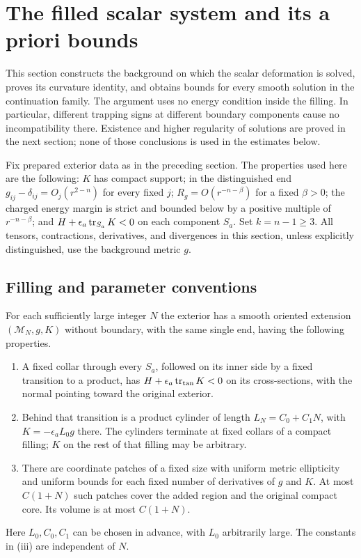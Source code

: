 \section{The filled scalar system and its a priori bounds}
\label{alg:section}

This section constructs the background on which the scalar deformation is
solved, proves its curvature identity, and obtains bounds for every smooth
solution in the continuation family.  The argument uses no energy condition
inside the filling.  In particular, different trapping signs at different
boundary components cause no incompatibility there.  Existence and higher
regularity of solutions are proved in the next section; none of those
conclusions is used in the estimates below.

Fix prepared exterior data as in the preceding section.  The properties used
here are the following: $K$ has compact support; in the distinguished end
$g_{ij}-\delta_{ij}=O_j(r^{2-n})$ for every fixed $j$;
$R_g=O(r^{-n-\beta})$ for a fixed $\beta>0$; the charged energy margin is
strict and bounded below by a positive multiple of $r^{-n-\beta}$; and
$H+\epsilon_a\operatorname{tr}_{S_a}K<0$ on each component $S_a$.  Set $k=n-1\geq3$.
All tensors, contractions, derivatives, and divergences in this section,
unless explicitly distinguished, use the background metric $g$.

\subsection{Filling and parameter conventions}

\begin{lemma}
\label{alg:filling}
For each sufficiently large integer $N$ the exterior has a smooth oriented
extension $(\mathcal M_N,g,K)$ without boundary, with the same single end,
having the following properties.
\begin{enumerate}[label=(\roman*)]
\item A fixed collar through every $S_a$, followed on its inner side by a
fixed transition to a product, has
$H+\epsilon_a\operatorname{tr}_{\mathrm{tan}}K<0$ on its cross-sections, with the normal
pointing toward the original exterior.
\item Behind that transition is a product cylinder of length
$L_N=C_0+C_1N$, with $K=-\epsilon_a L_0g$ there.  The cylinders terminate
at fixed collars of a compact filling; $K$ on the rest of that filling may
be arbitrary.
\item There are coordinate patches of a fixed size with uniform metric
ellipticity and uniform bounds for each fixed number of derivatives of
$g$ and $K$.  At most $C(1+N)$ such patches cover the added region and
the original compact core.  Its volume is at most $C(1+N)$.
\end{enumerate}
Here $L_0,C_0,C_1$ can be chosen in advance, with $L_0$ arbitrarily large.
The constants in (iii) are independent of $N$.
\end{lemma}

